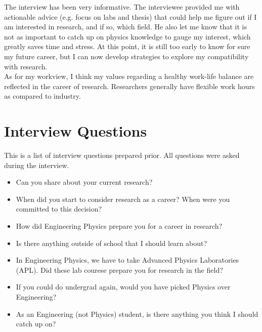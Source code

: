 \documentclass[12pt]{article}
\begin{document}
The interview has been very informative. The interviewee provided me with actionable advice (e.g. focus on labs and thesis) that could help me figure out if I am interested in research, and if so, which field. He also let me know that it is not as important to catch up on physics knowledge to gauge my interest, which greatly saves time and stress. At this point, it is still too early to know for sure my future career, but I can now develop strategies to explore my compatibility with research. \\
As for my workview, I think my values regarding a healthy work-life balance are reflected in the career of research. Researchers generally have flexible work hours as compared to industry.

\section{Interview Questions} \label{qs}

This is a list of interview questions prepared prior. All questions were asked during the interview.
\begin{itemize}
    \item Can you share about your current research?
    \item When did you start to consider research as a career? When were you committed to this decision?
    \item How did Engineering Physics prepare you for a career in research?
    \item Is there anything outside of school that I should learn about?
    \item In Engineering Physics, we have to take Advanced Physics Laboratories (APL). Did these lab courese prepare you for research in the field?
    \item If you could do undergrad again, would you have picked Physics over Engineering?
    \item As an Engineering (not Physics) student, is there anything you think I should catch up on?
\end{itemize}



\end{document}
